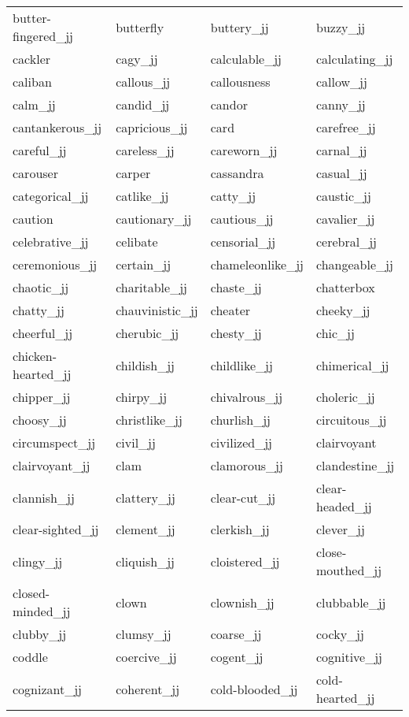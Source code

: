 \begin{longtable}[!htbp]{| llll |}
   butter-fingered\_jj & butterfly & buttery\_jj & buzzy\_jj \\
   cackler & cagy\_jj & calculable\_jj & calculating\_jj \\
   caliban & callous\_jj & callousness & callow\_jj \\
   calm\_jj & candid\_jj & candor & canny\_jj \\
   cantankerous\_jj & capricious\_jj & card & carefree\_jj \\
   careful\_jj & careless\_jj & careworn\_jj & carnal\_jj \\
   carouser & carper & cassandra & casual\_jj \\
   categorical\_jj & catlike\_jj & catty\_jj & caustic\_jj \\
   caution & cautionary\_jj & cautious\_jj & cavalier\_jj \\
   celebrative\_jj & celibate & censorial\_jj & cerebral\_jj \\
   ceremonious\_jj & certain\_jj & chameleonlike\_jj & changeable\_jj \\
   chaotic\_jj & charitable\_jj & chaste\_jj & chatterbox \\
   chatty\_jj & chauvinistic\_jj & cheater & cheeky\_jj \\
   cheerful\_jj & cherubic\_jj & chesty\_jj & chic\_jj \\
   chicken-hearted\_jj & childish\_jj & childlike\_jj & chimerical\_jj \\
   chipper\_jj & chirpy\_jj & chivalrous\_jj & choleric\_jj \\
   choosy\_jj & christlike\_jj & churlish\_jj & circuitous\_jj \\
   circumspect\_jj & civil\_jj & civilized\_jj & clairvoyant \\
   clairvoyant\_jj & clam & clamorous\_jj & clandestine\_jj \\
   clannish\_jj & clattery\_jj & clear-cut\_jj & clear-headed\_jj \\
   clear-sighted\_jj & clement\_jj & clerkish\_jj & clever\_jj \\
   clingy\_jj & cliquish\_jj & cloistered\_jj & close-mouthed\_jj \\
   closed-minded\_jj & clown & clownish\_jj & clubbable\_jj \\
   clubby\_jj & clumsy\_jj & coarse\_jj & cocky\_jj \\
   coddle & coercive\_jj & cogent\_jj & cognitive\_jj \\
   cognizant\_jj & coherent\_jj & cold-blooded\_jj & cold-hearted\_jj \\

\end{longtable}
